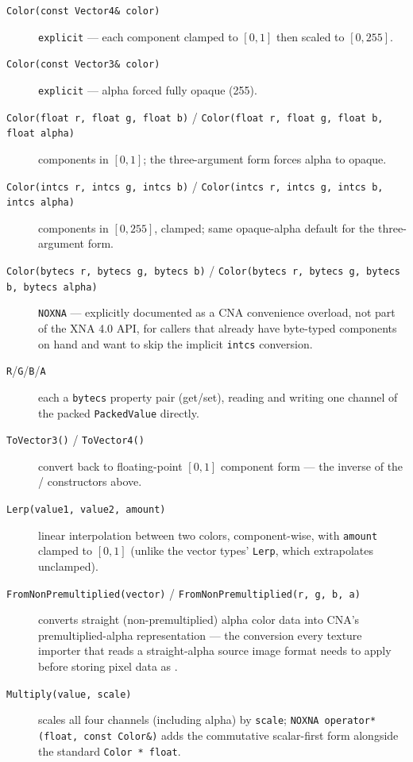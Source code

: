 \begin{description}
\item[\texttt{Color(const Vector4\& color)}] \texttt{explicit} --- each component clamped to
  $[0,1]$ then scaled to $[0,255]$.
\item[\texttt{Color(const Vector3\& color)}] \texttt{explicit} --- alpha forced fully opaque
  (255).
\item[\texttt{Color(float r, float g, float b)} / \texttt{Color(float r, float g, float b,
  float alpha)}] components in $[0,1]$; the three-argument form forces alpha to opaque.
\item[\texttt{Color(intcs r, intcs g, intcs b)} / \texttt{Color(intcs r, intcs g, intcs b,
  intcs alpha)}] components in $[0,255]$, clamped; same opaque-alpha default for the
  three-argument form.
\item[\texttt{Color(bytecs r, bytecs g, bytecs b)} / \texttt{Color(bytecs r, bytecs g, bytecs
  b, bytecs alpha)}] \texttt{NOXNA} --- explicitly documented as a CNA convenience overload,
  not part of the XNA 4.0 API, for callers that already have byte-typed components on hand and
  want to skip the implicit \texttt{intcs} conversion.
\item[\texttt{R}/\texttt{G}/\texttt{B}/\texttt{A}] each a \texttt{bytecs} property pair
  (get/set), reading and writing one channel of the packed \texttt{PackedValue} directly.
\item[\texttt{ToVector3()} / \texttt{ToVector4()}] convert back to floating-point $[0,1]$
  component form --- the inverse of the / constructors
  above.
\item[\texttt{Lerp(value1, value2, amount)}] linear interpolation between two colors,
  component-wise, with \texttt{amount} clamped to $[0,1]$ (unlike the vector types'
  \texttt{Lerp}, which extrapolates unclamped).
\item[\texttt{FromNonPremultiplied(vector)} / \texttt{FromNonPremultiplied(r, g, b, a)}]
  converts straight (non-premultiplied) alpha color data into CNA's premultiplied-alpha
   representation --- the conversion every texture importer that reads a
  straight-alpha source image format needs to apply before storing pixel data as
  .
\item[\texttt{Multiply(value, scale)}] scales all four channels (including alpha) by
  \texttt{scale}; \texttt{NOXNA operator*(float, const Color\&)} adds the commutative
  scalar-first form alongside the standard \texttt{Color * float}.
\end{description}

